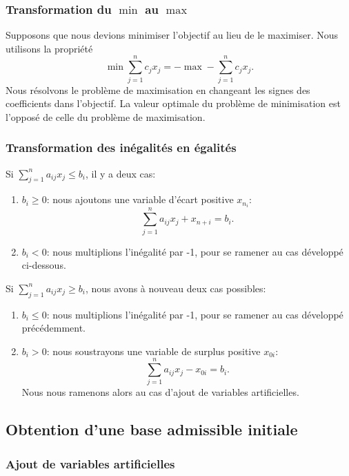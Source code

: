 \subsubsection{Transformation du $\min$ au $\max$}

Supposons que nous devions minimiser l'objectif au lieu de le maximiser.
Nous utilisons la propriété
\[
\min \sum_{j=1}^n c_j x_j = -\max -\sum_{j=1}^n c_j x_j.
\]
Nous résolvons le problème de maximisation en changeant les signes des coefficients dans l'objectif.
La valeur optimale du problème de minimisation est l'opposé de celle du problème de maximisation.

\subsubsection{Transformation des inégalités en égalités}

Si $\sum_{j=1}^n a_{ij} x_j \leq b_i$, il y a deux cas:
\begin{enumerate}
\item
$b_i \geq 0$: nous ajoutons une variable d'écart positive $x_{n_i}$:
\[
\sum_{j = 1}^n a_{ij} x_j + x_{n+i} = b_i.
\]
\item
$b_i < 0$: nous multiplions l'inégalité par -1, pour se ramener au cas développé ci-dessous.
\end{enumerate}

Si $\sum_{j=1}^n a_{ij} x_j \geq b_i$, nous avons à nouveau deux cas possibles:
\begin{enumerate}
\item
$b_i \leq 0$: nous multiplions l'inégalité par -1, pour se ramener au cas développé précédemment.
\item
$b_i > 0$: nous soustrayons une variable de surplus positive $x_{0i}$:
\[
\sum_{j = 1}^n a_{ij} x_j - x_{0i} = b_i.
\]
Nous nous ramenons alors au cas d'ajout de variables artificielles.
\end{enumerate}

\subsection{Obtention d'une base admissible initiale}

\subsubsection{Ajout de variables artificielles}

